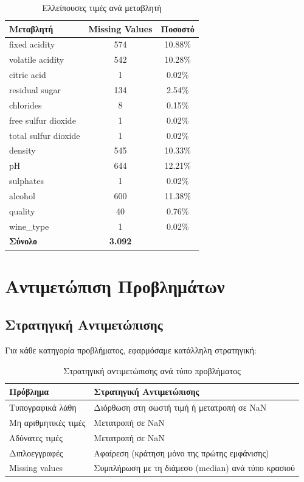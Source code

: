 \documentclass[12pt,a4paper]{article}
\begin{document}
\begin{table}[H]
\centering
\caption{Ελλείπουσες τιμές ανά μεταβλητή}
\label{tab:missing}
\begin{tabular}{@{}lcc@{}}
\toprule
\textbf{Μεταβλητή} & \textbf{Missing Values} & \textbf{Ποσοστό} \\
\midrule
fixed acidity & 574 & 10.88\% \\
volatile acidity & 542 & 10.28\% \\
citric acid & 1 & 0.02\% \\
residual sugar & 134 & 2.54\% \\
chlorides & 8 & 0.15\% \\
free sulfur dioxide & 1 & 0.02\% \\
total sulfur dioxide & 1 & 0.02\% \\
density & 545 & 10.33\% \\
pH & 644 & 12.21\% \\
sulphates & 1 & 0.02\% \\
alcohol & 600 & 11.38\% \\
quality & 40 & 0.76\% \\
wine\_type & 1 & 0.02\% \\
\midrule
\textbf{Σύνολο} & \textbf{3.092} & \\
\bottomrule
\end{tabular}
\end{table}

\section{Αντιμετώπιση Προβλημάτων}

\subsection{Στρατηγική Αντιμετώπισης}

Για κάθε κατηγορία προβλήματος, εφαρμόσαμε κατάλληλη στρατηγική:

\begin{table}[H]
\centering
\caption{Στρατηγική αντιμετώπισης ανά τύπο προβλήματος}
\label{tab:strategy}
\begin{tabular}{@{}lp{10cm}@{}}
\toprule
\textbf{Πρόβλημα} & \textbf{Στρατηγική Αντιμετώπισης} \\
\midrule
Τυπογραφικά λάθη & Διόρθωση στη σωστή τιμή ή μετατροπή σε NaN \\
Μη αριθμητικές τιμές & Μετατροπή σε NaN \\
Αδύνατες τιμές & Μετατροπή σε NaN \\
Διπλοεγγραφές & Αφαίρεση (κράτηση μόνο της πρώτης εμφάνισης) \\
Missing values & Συμπλήρωση με τη διάμεσο (median) ανά τύπο κρασιού \\
\bottomrule
\end{tabular}
\end{table}
\end{document}
